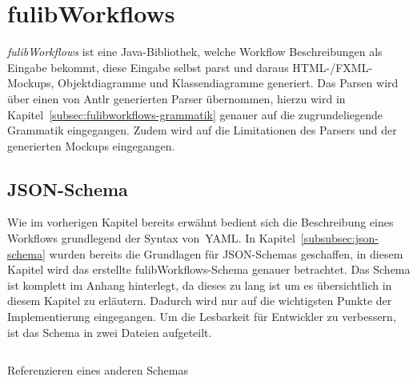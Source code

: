 \section{fulibWorkflows}\label{sec:fulibworkflows2}
\textit{fulibWorkflows} ist eine Java-Bibliothek, welche Workflow Beschreibungen als Eingabe bekommt, diese Eingabe
selbst parst und daraus HTML-/FXML-Mockups, Objektdiagramme und Klassendiagramme generiert.
Das Parsen wird über einen von Antlr generierten Parser übernommen, hierzu wird in Kapitel~\ref{subsec:fulibworkflows-grammatik} genauer auf
die zugrundeliegende Grammatik eingegangen.
Zudem wird auf die Limitationen des Parsers und der generierten Mockups eingegangen.



\subsection{JSON-Schema}\label{subsec:schema}
Wie im vorherigen Kapitel bereits erwähnt bedient sich die Beschreibung eines Workflows grundlegend der Syntax von~\ac*{YAML}.
In Kapitel~\ref{subsubsec:json-schema} wurden bereits die Grundlagen für JSON-Schemas geschaffen, in diesem Kapitel wird das erstellte
fulibWorkflows-Schema genauer betrachtet.
Das Schema ist komplett im Anhang hinterlegt, da dieses zu lang ist um es übersichtlich in diesem Kapitel zu erläutern.
Dadurch wird nur auf die wichtigsten Punkte der Implementierung eingegangen.
Um die Lesbarkeit für Entwickler zu verbessern, ist das Schema in zwei Dateien aufgeteilt.

\begin{listing}[!ht]
    \inputminted[xleftmargin=20pt,linenos]{json}{listings/3.1/page.json}
    \caption{Referenzieren eines anderen Schemas}
    \label{listing:schema-split}
\end{listing}

